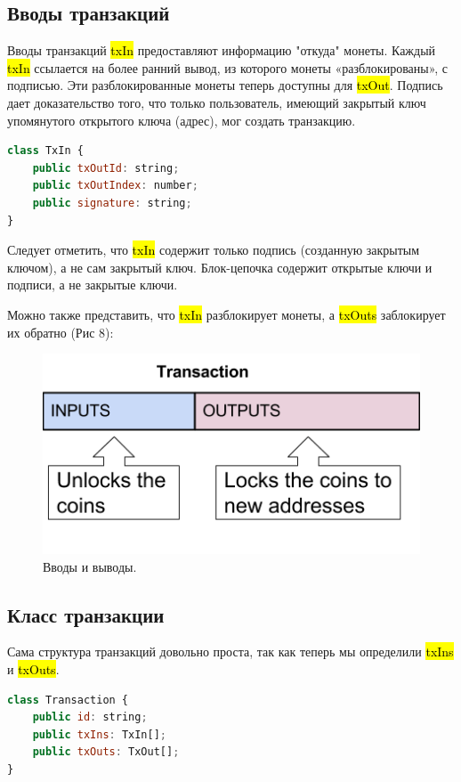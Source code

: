 \documentclass{article}
\begin{document}
\subsection{Вводы транзакций}

Вводы транзакций \hl{txIn} предоставляют информацию "откуда" монеты. Каждый \hl{txIn} ссылается на более ранний вывод, из которого монеты «разблокированы», с подписью. Эти разблокированные монеты теперь доступны для \hl{txOut}. Подпись дает доказательство того, что только пользователь, имеющий закрытый ключ упомянутого открытого ключа (адрес), мог создать транзакцию.

\begin{lstlisting}[language=JavaScript, caption={Класс вводы транзакции.}]
class TxIn {
	public txOutId: string;
	public txOutIndex: number;
	public signature: string;
}
\end{lstlisting}

Следует отметить, что \hl{txIn} содержит только подпись (созданную закрытым ключом), а не сам закрытый ключ. Блок-цепочка содержит открытые ключи и подписи, а не закрытые ключи.

Можно также представить, что \hl{txIn} разблокирует монеты, а \hl{txOuts} заблокирует их обратно (Рис 8):

\begin{figure}
	\centering
	\includegraphics[scale=0.45]{trans_lock}
	\caption{Вводы и выводы.}
	\label{fig:trans_lock}
\end{figure}

\subsection{Класс транзакции}

Сама структура транзакций довольно проста, так как теперь мы определили \hl{txIns} и \hl{txOuts}.

\begin{lstlisting}[language=JavaScript, caption={Класс транзакции.}]
class Transaction {
	public id: string;
	public txIns: TxIn[];
	public txOuts: TxOut[];
}
\end{lstlisting}
\end{document}

